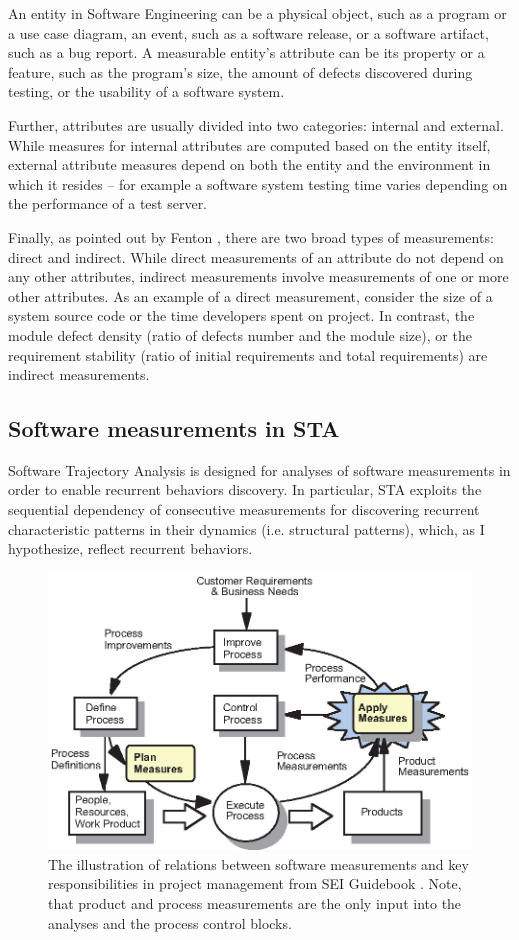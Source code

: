 An entity in Software Engineering can be a physical object, such as a program or a use case diagram, 
an event, such as a software release, or a software artifact, such as a bug report.
A measurable entity's attribute can be its property or a feature, such as the program's size, the 
amount of defects discovered during testing, or the usability of a software system.

Further, attributes are usually divided into two categories: internal and external. 
While measures for internal attributes are computed based on the entity itself, external attribute 
measures depend on both the entity and the environment in which it resides -- for example a 
software system testing time varies depending on the performance of a test server.

Finally, as pointed out by Fenton \cite{citeulike:1803429}, there are two broad types of measurements: direct
and indirect. While direct measurements of an attribute do not depend on any other attributes, 
indirect measurements involve measurements of one or more other attributes. 
As an example of a direct measurement, consider the size of a system source code or the time developers spent 
on project. In contrast, the module defect density (ratio of defects number and the module size), 
or the requirement stability (ratio of initial requirements and total requirements) are indirect measurements.

\subsection{Software measurements in STA}
Software Trajectory Analysis is designed for analyses of software measurements in order to enable 
recurrent behaviors discovery. In particular, STA exploits the sequential dependency of consecutive 
measurements for discovering recurrent characteristic patterns in their dynamics (i.e. structural patterns), 
which, as I hypothesize, reflect recurrent behaviors.

\begin{figure}[t]
   \centering
   \includegraphics[width=115mm]{figures/SEI-measurements.eps}
   \caption{The illustration of relations between software measurements and key responsibilities 
   in project management from SEI Guidebook \cite{citeulike:10567306}. Note, that product and process 
   measurements are the only input into the analyses and the process control blocks.}
   \label{fig:sei-measures}
\end{figure}

